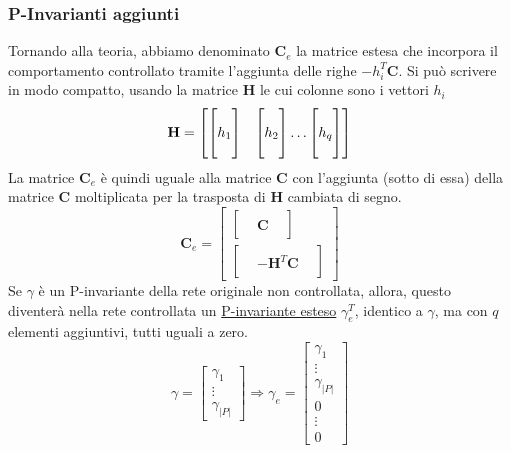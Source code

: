 \documentclass[10pt, letterpaper]{report}
\begin{document}
\subsubsection{P-Invarianti aggiunti}
Tornando alla teoria, abbiamo denominato $\mathbf C_e$ la matrice estesa che incorpora il comportamento controllato tramite l'aggiunta delle righe $-h^T_i\mathbf C$. Si può scrivere in modo compatto, usando la matrice $\mathbf H$ le cui colonne sono i vettori $h_i$
$$\mathbf H=\begin{bmatrix}
    \begin{bmatrix}
        \\ h_1 \\  \hphantom{a}
    \end{bmatrix}& 
    \begin{bmatrix}
        \\ h_2 \\  \hphantom{a}
    \end{bmatrix}\dots  
    \begin{bmatrix}
        \\ h_q \\ \hphantom{a}
    \end{bmatrix}
\end{bmatrix} $$
La matrice $\mathbf C_e$ è quindi uguale alla matrice $\mathbf C$ con l'aggiunta (sotto di essa) della matrice $\mathbf C$ moltiplicata per la trasposta di $\mathbf H$ cambiata di segno. 
$$ \mathbf C_e=\begin{bmatrix}
    \begin{bmatrix}
    & &  \\
    &\mathbf C & \\  
    & &
    \end{bmatrix}\\ 
    \begin{bmatrix}
        & &  \\
        &-\mathbf H^T\mathbf C & \\  
        & &
        \end{bmatrix}
\end{bmatrix}$$
Se $\gamma$ è un P-invariante della rete originale non controllata, allora, questo diventerà nella rete controllata un \underline{P-invariante esteso} $\gamma^T_e$, identico a $\gamma$, ma con $q$ elementi aggiuntivi, tutti uguali a zero. 
$$ \gamma=\begin{bmatrix}
    \gamma_1\\ \vdots \\ \gamma_{|P|}
\end{bmatrix}\Longrightarrow \gamma_e=\begin{bmatrix}
    \gamma_1\\ \vdots \\ \gamma_{|P|} \\ 0 \\ \vdots \\ 0
\end{bmatrix}$$
\end{document}
